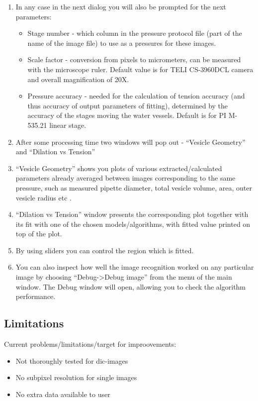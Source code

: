 \begin{enumerate}
	\item In any case in the next dialog you will also be prompted for the next parameters:
	\begin{itemize}
		\item Stage number - which column in the pressure protocol file (part of the name of the image file) to use as a pressures for these images.
		\item Scale factor - conversion from pixels to micrometers, can be measured with the microscope ruler. Default value is for TELI CS-3960DCL camera and overall magnification of 20X.
		\item Pressure accuracy - needed for the calculation of tension accuracy (and thus accuracy of output parameters of fitting), determined by the accuracy of the stages moving the water vessels. Default is for PI M-535.21 linear stage.
	\end{itemize}
	\item After some processing time two windows will pop out - ``Vesicle Geometry'' and ``Dilation vs Tension''
	\item ``Vesicle Geometry'' shows you plots of various extracted/calculated parameters already averaged between images corresponding to the same pressure, such as measured pipette diameter, total vesicle volume, area, outer vesicle radius etc  .
	\item ``Dilation vs Tension'' window presents the corresponding plot together with its fit with one of the chosen models/algorithms, with fitted value printed on top of the plot.
	\item By using sliders you can control the region which is fitted.
	\item You can also inspect how well the image recognition worked on any particular image by choosing ``Debug->Debug image'' from the menu of the main window. The Debug window will open, allowing you to check the algorithm performance.
\end{enumerate}

\subsection{Limitations}\label{vampy-limits}
Current problems/limitations/target for improovements:
\begin{itemize}
	\item Not thoroughly tested for dic-images
	\item No subpixel resolution for single images
	\item No extra data available to user
\end{itemize}
